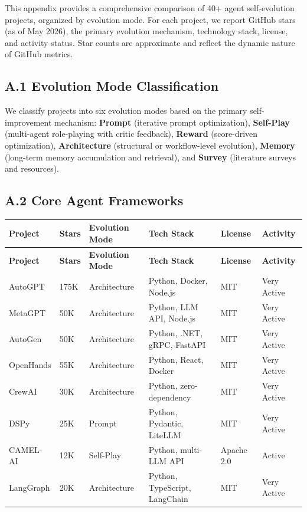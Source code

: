 This appendix provides a comprehensive comparison of 40+ agent self-evolution projects, organized by evolution mode. For each project, we report GitHub stars (as of May 2026), the primary evolution mechanism, technology stack, license, and activity status. Star counts are approximate and reflect the dynamic nature of GitHub metrics.

\subsection*{A.1 Evolution Mode Classification}

We classify projects into six evolution modes based on the primary self-improvement mechanism: \textbf{Prompt} (iterative prompt optimization), \textbf{Self-Play} (multi-agent role-playing with critic feedback), \textbf{Reward} (score-driven optimization), \textbf{Architecture} (structural or workflow-level evolution), \textbf{Memory} (long-term memory accumulation and retrieval), and \textbf{Survey} (literature surveys and resources).

\subsection*{A.2 Core Agent Frameworks}

\begin{longtable}{p{28mm}p{12mm}p{24mm}p{18mm}p{14mm}p{14mm}}
\toprule
\textbf{Project} & \textbf{Stars} & \textbf{Evolution Mode} & \textbf{Tech Stack} & \textbf{License} & \textbf{Activity} \\
\midrule
\endfirsthead
\toprule
\textbf{Project} & \textbf{Stars} & \textbf{Evolution Mode} & \textbf{Tech Stack} & \textbf{License} & \textbf{Activity} \\
\midrule
\endhead

AutoGPT & 175K & Architecture & Python, Docker, Node.js & MIT & Very Active \\
MetaGPT & 50K & Architecture & Python, LLM API, Node.js & MIT & Very Active \\
AutoGen & 50K & Architecture & Python, .NET, gRPC, FastAPI & MIT & Very Active \\
OpenHands & 55K & Architecture & Python, React, Docker & MIT & Very Active \\
CrewAI & 30K & Architecture & Python, zero-dependency & MIT & Very Active \\
DSPy & 25K & Prompt & Python, Pydantic, LiteLLM & MIT & Very Active \\
CAMEL-AI & 12K & Self-Play & Python, multi-LLM API & Apache 2.0 & Active \\
LangGraph & 20K & Architecture & Python, TypeScript, LangChain & MIT & Very Active \\
\bottomrule
\end{longtable}

